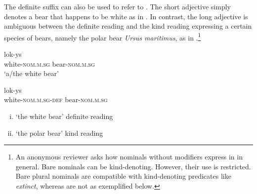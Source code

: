 \documentclass[output=paper,
modfonts
]{langscibook}
\begin{document}
The definite suffix can also be used to refer to  \citep{Rutkowski06}. The short adjective simply denotes a bear that happens to be white as in . In contrast, the long adjective is ambiguous between the definite reading and the kind reading expressing a certain species of bears, namely the polar bear \textit{Ursus maritimus}, as in .\footnote{An anonymous reviewer asks how nominals without modifiers express  in  in general. Bare nominals can be kind-denoting. However, their use is restricted. Bare plural nominals are compatible with kind-denoting predicates like \textit{extinct}, whereas  are not as exemplified below.	
\ea {}

\z
\z\vspace*{-\baselineskip}}

\begin{exe}
\ex \label{ex:sereikaite:11}
\begin{xlist}
\ex \label{ex:sereikaite:11a}
 {lok-ys} \\
white-\textsc{nom.m.sg} bear-\textsc{nom.m.sg} \\
\trans `a/the white bear'  

\ex \label{ex:sereikaite:11b}
 {lok-ys}\\
white-\textsc{nom.m.sg}-\textsc{def} bear-\textsc{nom.m.sg}  \\
\trans 
\begin{enumerate}[(i)]
	\item `the white bear' \checkmark definite reading 
	\item `the polar bear' \checkmark kind reading
\end{enumerate}
 
\end{xlist}
\end{exe}
\end{document}
